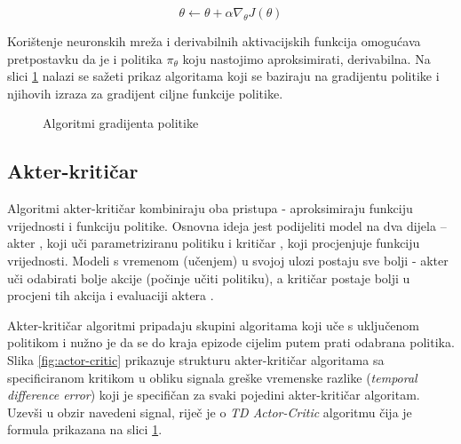 \begin{equation}
    \label{md:gradient-ascend}
    \theta \leftarrow \theta + \alpha \nabla_\theta J(\theta)
\end{equation}

\bigskip

Korištenje neuronskih mreža i derivabilnih aktivacijskih funkcija omogućava pretpostavku da je i politika $\pi_\theta$ koju nastojimo aproksimirati, derivabilna. Na slici \ref{fig:policy-gradient-algos} nalazi se sažeti prikaz algoritama koji se baziraju na gradijentu politike  i njihovih izraza za gradijent ciljne funkcije politike.

\begin{figure}[H]
    \centering
    \caption{Algoritmi gradijenta politike \cite{pg-methods}}
    \label{fig:policy-gradient-algos}
\end{figure}

\subsection{Akter-kritičar}

Algoritmi akter-kritičar  kombiniraju oba pristupa - aproksimiraju funkciju vrijednosti i funkciju politike. Osnovna ideja jest podijeliti model na dva dijela – akter , koji uči parametriziranu politiku i kritičar , koji procjenjuje funkciju vrijednosti. Modeli s vremenom (učenjem) u svojoj ulozi postaju sve bolji - akter uči odabirati bolje akcije (počinje učiti politiku), a kritičar postaje bolji u procjeni tih akcija i evaluaciji aktera \cite{AC}.

Akter-kritičar algoritmi pripadaju skupini algoritama koji uče s uključenom politikom i nužno je da se do kraja epizode cijelim putem prati odabrana politika. Slika \ref{fig:actor-critic} prikazuje strukturu akter-kritičar algoritama sa specificiranom kritikom u obliku signala greške vremenske razlike (\textit{temporal difference error}) koji je specifičan za svaki pojedini akter-kritičar algoritam. Uzevši u obzir navedeni signal, riječ je o \textit{TD Actor-Critic} algoritmu čija je formula prikazana na slici \ref{fig:policy-gradient-algos}.

